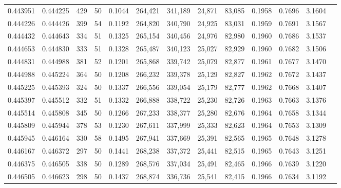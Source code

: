 \begin{tabular}{rrrrrrrrrrrrr}
0.443951 & 0.444225 &   429 &  50 &                                     0.1044 & 264,421 & 341,189 &  24,871 &  83,085 & 0.1958 & 0.7696 & 3.1604 \\
0.444226 & 0.444426 &   399 &  54 &                                     0.1192 & 264,820 & 340,790 &  24,925 &  83,031 & 0.1959 & 0.7691 & 3.1567 \\
0.444432 & 0.444643 &   334 &  51 &                                     0.1325 & 265,154 & 340,456 &  24,976 &  82,980 & 0.1960 & 0.7686 & 3.1537 \\
0.444653 & 0.444830 &   333 &  51 &                                     0.1328 & 265,487 & 340,123 &  25,027 &  82,929 & 0.1960 & 0.7682 & 3.1506 \\
0.444831 & 0.444988 &   381 &  52 &                                     0.1201 & 265,868 & 339,742 &  25,079 &  82,877 & 0.1961 & 0.7677 & 3.1470 \\
0.444988 & 0.445224 &   364 &  50 &                                     0.1208 & 266,232 & 339,378 &  25,129 &  82,827 & 0.1962 & 0.7672 & 3.1437 \\
0.445225 & 0.445393 &   324 &  50 &                                     0.1337 & 266,556 & 339,054 &  25,179 &  82,777 & 0.1962 & 0.7668 & 3.1407 \\
0.445397 & 0.445512 &   332 &  51 &                                     0.1332 & 266,888 & 338,722 &  25,230 &  82,726 & 0.1963 & 0.7663 & 3.1376 \\
0.445514 & 0.445808 &   345 &  50 &                                     0.1266 & 267,233 & 338,377 &  25,280 &  82,676 & 0.1964 & 0.7658 & 3.1344 \\
0.445809 & 0.445944 &   378 &  53 &                                     0.1230 & 267,611 & 337,999 &  25,333 &  82,623 & 0.1964 & 0.7653 & 3.1309 \\
0.445945 & 0.446164 &   330 &  58 &                                     0.1495 & 267,941 & 337,669 &  25,391 &  82,565 & 0.1965 & 0.7648 & 3.1278 \\
0.446167 & 0.446372 &   297 &  50 &                                     0.1441 & 268,238 & 337,372 &  25,441 &  82,515 & 0.1965 & 0.7643 & 3.1251 \\
0.446375 & 0.446505 &   338 &  50 &                                     0.1289 & 268,576 & 337,034 &  25,491 &  82,465 & 0.1966 & 0.7639 & 3.1220 \\
0.446505 & 0.446623 &   298 &  50 &                                     0.1437 & 268,874 & 336,736 &  25,541 &  82,415 & 0.1966 & 0.7634 & 3.1192 \\

\end{tabular}
